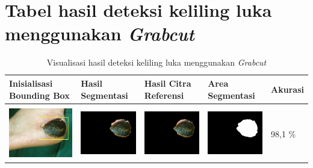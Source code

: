 \chapter{Tabel hasil deteksi keliling luka menggunakan \emph{Grabcut}}
\begin{table}[H]
	\centering
	\caption{Visualisasi hasil deteksi keliling luka menggunakan \emph{Grabcut}}
	\label{tabel_hasil_1}
	\begin{tabular}{|m{1.1in}|m{1.1in}|m{1.1in}|m{1.1in}|m{0.7in}|}
		\hline
		\textbf{Inisialisasi Bounding Box} & \textbf{Hasil Segmentasi} & \textbf{Hasil Citra Referensi} & \textbf{Area Segmentasi} & \textbf{Akurasi} \\
		\hline
		
		&  &  & \\
		\includegraphics[width=1.1in]{gambar/hasil_segmentasi/luka_hitam/image_2_rect.jpg} \fontsize{8}{12}{(153,48,299,158)}&
		\includegraphics[width=1.1in]{gambar/hasil_segmentasi/luka_hitam/result_2.jpg}&
		\includegraphics[width=1.1in]{gambar/hasil_segmentasi/luka_hitam/result_2_cv.jpg}&
		\includegraphics[width=1.1in]{gambar/hasil_segmentasi/luka_hitam/mask_2.jpg}&
		98,1 \% \\
		\hline


\end{tabular}
\end{table}
